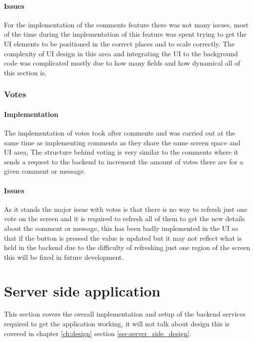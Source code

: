 \paragraph*{Issues}

For the implementation of the comments feature there was not many issues, most of the time during the implementation of this feature was spent trying to get the UI elements to be positioned in the correct places and to scale correctly. The complexity of UI design in this area and integrating the UI to the background code was complicated mostly due to how many fields and how dynamical all of this section is.

\subsubsection*{Votes}

\paragraph*{Implementation}

The implementation of votes took after comments and was carried out at the same time as implementing comments as they share the same screen space and UI area, The structure behind voting is very similar to the comments where it sends a request to the backend to increment the amount of votes there are for a given comment or message.

\paragraph*{Issues}

As it stands the major issue with votes is that there is no way to refresh just one vote on the screen and it is required to refresh all of them to get the new details about the comment or message, this has been badly implemented in the UI so that if the button is pressed the value is updated but it may not reflect what is held in the backend due to the difficulty of refreshing just one region of the screen this will be fixed in future development.

\section{Server side application}

This section covers the overall implementation and setup of the backend services required to get the application working, it will not talk about design this is covered in chapter \ref{ch:design} section \ref{sec:server_side_design}.

